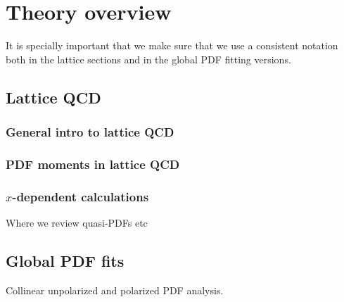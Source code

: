 
\section{Theory overview}

It is specially important that we make sure that we use a consistent
notation both in the lattice sections and in the global
PDF fitting versions.

\subsection{Lattice QCD}


\subsubsection{General intro to lattice QCD}


\subsubsection{PDF moments in lattice QCD}


\subsubsection{$x$-dependent calculations}

Where we review quasi-PDFs etc



\subsection{Global PDF fits}

Collinear unpolarized and polarized PDF analysis.
